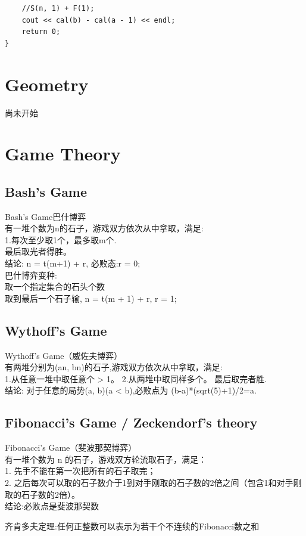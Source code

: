 \documentclass[10pt]{ctexart}
\begin{document}
{\begin{lstlisting}
    //S(n, 1) + F(1);
    cout << cal(b) - cal(a - 1) << endl;
    return 0;
}
\end{lstlisting}

\newpage
\section{Geometry}
尚未开始


\newpage
\section{Game Theory}
\subsection{Bash's Game}
Bash's Game巴什博弈\\
有一堆个数为n的石子，游戏双方依次从中拿取，满足:\\
1.每次至少取1个，最多取m个.\\
最后取光者得胜。\\
结论: n = t(m+1) + r, 必败态:r = 0;\\
巴什博弈变种:\\
取一个指定集合的石头个数\\
取到最后一个石子输, n = t(m + 1)  + r, r = 1;\\
\subsection{Wythoff’s Game}
Wythoff’s Game（威佐夫博弈）\\
有两堆分别为(an, bn)的石子,游戏双方依次从中拿取，满足:\\
1.从任意一堆中取任意个 > 1。 
2.从两堆中取同样多个。
最后取完者胜.\\
结论: 对于任意的局势(a, b)(a < b),必败点为 (b-a)*(sqrt(5)+1)/2=a. \\
\subsection{Fibonacci’s Game / Zeckendorf's theory}
Fibonacci’s Game（斐波那契博弈）\\
有一堆个数为 n 的石子，游戏双方轮流取石子，满足：\\
1. 先手不能在第一次把所有的石子取完；\\
2. 之后每次可以取的石子数介于1到对手刚取的石子数的2倍之间（包含1和对手刚取的石子数的2倍）。\\
结论:必败点是斐波那契数\\
\par
齐肯多夫定理:任何正整数可以表示为若干个不连续的Fibonacci数之和\\
}
\end{document}
